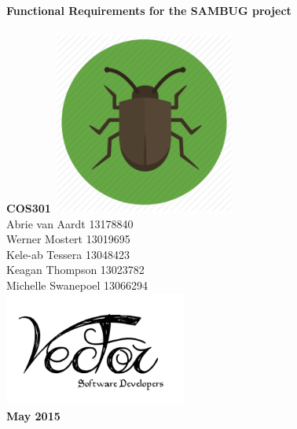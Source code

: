 \documentclass[11pt,a4paper,titlepage]{article}
\begin{document}

\begin{titlepage}
    \centering
    \vfill
    {\bfseries\Huge
         Functional Requirements for the SAMBUG project\\
      \hfill\\
         \Large COS301
        \vskip2cm
        \includegraphics[width=6cm]{sambug} \\

    }    
    \vfill
        Abrie van Aardt 13178840\\
		Werner Mostert 13019695\\
		Kele-ab Tessera 13048423\\
		Keagan Thompson 13023782\\
		Michelle Swanepoel 13066294\\
    
    
    \vfill
    \includegraphics[width=6cm]{logo} \\
    \textbf{May 2015}
    \vfill
\end{titlepage}
	
    
\end{document}
